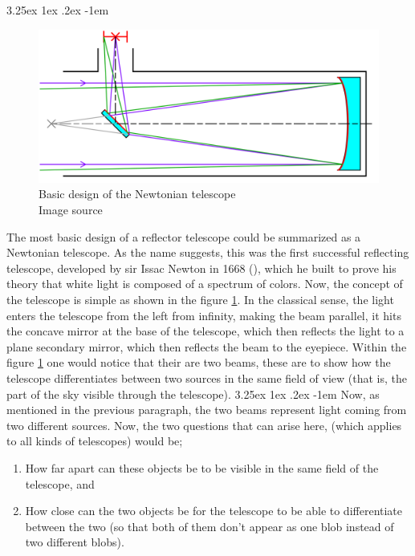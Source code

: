 \documentclass[a4paper,twoside,11pt]{article}
\makeatletter
\numberwithin{equation}{section}
\renewcommand\paragraph{\@startsection{paragraph}{5}{\z@}%
  {3.25ex \@plus1ex \@minus.2ex}%
  {-1em}%
  {\normalfont\normalsize\bfseries}}
\makeatother
\begin{document}
\paragraph{}
\begin{figure}
\begin{center}
\includegraphics[width=1\linewidth]{fig6.png} 
\caption{Basic design of the Newtonian telescope \\ Image source \cite{newttele2}}
\label{fig6}
\end{center}
\end{figure}
The most basic design of a reflector telescope could be summarized as a Newtonian telescope. As the name suggests, this was the first successful reflecting telescope, developed by sir Issac Newton in 1668 (\cite{newttele1}), which he built to prove his theory that white light is composed of a spectrum of colors. Now, the concept of the telescope is simple as shown in the figure \ref{fig6}. In the classical sense, the light enters the telescope from the left from infinity, making the beam parallel, it hits the concave mirror at the base of the telescope, which then reflects the light to a plane secondary mirror, which then reflects the beam to the eyepiece. Within the figure \ref{fig6} one would notice that their are two beams, these are to show how the telescope differentiates between two sources in the same field of view (that is, the part of the sky visible through the telescope).
\paragraph{}
Now, as mentioned in the previous paragraph, the two beams represent light coming from two different sources. Now, the two questions that can arise here, (which applies to all kinds of telescopes) would be;
\begin{enumerate}
\item How far apart can these objects be to be visible in the same field of the telescope, and 
\item How close can the two objects be for the telescope to be able to differentiate between the two (so that both of them don't appear as one blob instead of two different blobs).
\end{enumerate}
\end{document}
